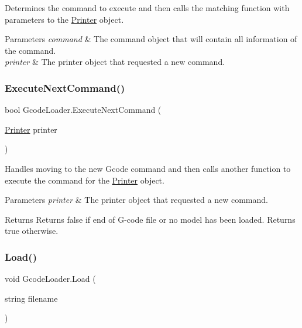 Determines the command to execute and then calls the matching function with parameters to the \hyperlink{class_printer}{Printer} object. 


\begin{DoxyParams}{Parameters}
{\em command} & The command object that will contain all information of the command.\\
\hline
{\em printer} & The printer object that requested a new command.\\
\hline
\end{DoxyParams}
\mbox{\label{class_gcode_loader_a295f2e6de27384942c01024adf7a0615}} 
\subsubsection{\texorpdfstring{Execute\+Next\+Command()}{ExecuteNextCommand()}}
{\footnotesize\ttfamily bool Gcode\+Loader.\+Execute\+Next\+Command (\begin{DoxyParamCaption}\item[{\hyperlink{class_printer}{Printer}}]{printer }\end{DoxyParamCaption})}



Handles moving to the new Gcode command and then calls another function to execute the command for the \hyperlink{class_printer}{Printer} object. 


\begin{DoxyParams}{Parameters}
{\em printer} & The printer object that requested a new command.\\
\hline
\end{DoxyParams}
\begin{DoxyReturn}{Returns}
Returns false if end of G-\/code file or no model has been loaded. Returns true otherwise.
\end{DoxyReturn}
\mbox{\label{class_gcode_loader_a921de7da9cc2e377a52977f30f8c1204}} 
\subsubsection{\texorpdfstring{Load()}{Load()}\hspace{0.1cm}{\footnotesize\ttfamily [1/2]}}
{\footnotesize\ttfamily void Gcode\+Loader.\+Load (\begin{DoxyParamCaption}\item[{string}]{filename }\end{DoxyParamCaption})}



